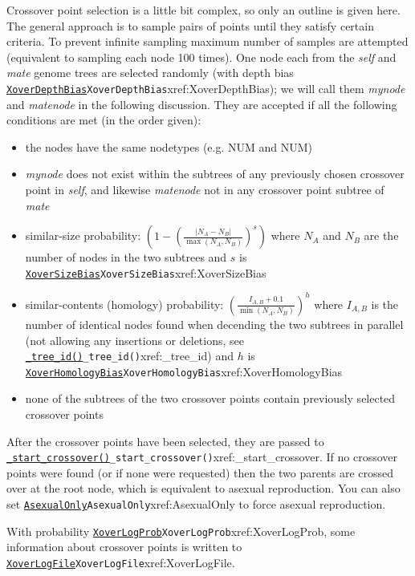 \documentclass[a4paper]{article}
\begin{document}
Crossover point selection is a little bit complex, so only an outline
is given here.  The general approach is to sample pairs of points
until they satisfy certain criteria.  To prevent infinite sampling
maximum number of samples are attempted (equivalent to sampling each
node 100 times).  One node each from the \textit{self} and
\textit{mate} genome trees are selected randomly (with depth bias
\hyperref[no]{\texttt{XoverDepthBias}}{\texttt{XoverDepthBias}}{xref:XoverDepthBias}); we will call them \textit{mynode} and
\textit{matenode} in the following discussion.  They are accepted if
all the following conditions are met (in the order given):
\begin{itemize}
\item the nodes have the same nodetypes (e.g. NUM and NUM)
\item \textit{mynode} does not exist within the subtrees of any previously chosen crossover point in \textit{self}, and likewise \textit{matenode} not in any crossover point subtree of \textit{mate}
\item similar-size probability:
 $ \left ( 1 - \left (\frac{|N_A - N_B|}{\max(N_A,N_B)} \right )^{s} \right ) $
where $N_A$ and $N_B$ are the number of nodes in the two subtrees and $s$ is \hyperref[no]{\texttt{XoverSizeBias}}{\texttt{XoverSizeBias}}{xref:XoverSizeBias}
\item similar-contents (homology) probability:
$ \left ( \frac{I_{A,B}+0.1}{\min(N_A,N_B)} \right )^{h} $
where $I_{A,B}$ is the number of identical nodes found when decending the two subtrees in parallel (not allowing any insertions or deletions, see \hyperref[no]{\texttt{\_tree\_id()}}{\texttt{\_tree\_id()}}{xref:_tree_id}) and $h$ is \hyperref[no]{\texttt{XoverHomologyBias}}{\texttt{XoverHomologyBias}}{xref:XoverHomologyBias}
\item none of the subtrees of the two crossover points contain previously selected crossover points
\end{itemize}

After the crossover points have been selected, they are passed to
\hyperref[no]{\texttt{\_start\_crossover()}}{\texttt{\_start\_crossover()}}{xref:_start_crossover}.  If no crossover points were found (or
if none were requested) then the two parents are crossed over at the
root node, which is equivalent to asexual reproduction.  You can also
set \hyperref[no]{\texttt{AsexualOnly}}{\texttt{AsexualOnly}}{xref:AsexualOnly} to force asexual reproduction.

With probability \hyperref[no]{\texttt{XoverLogProb}}{\texttt{XoverLogProb}}{xref:XoverLogProb}, some information about
crossover points is written to \hyperref[no]{\texttt{XoverLogFile}}{\texttt{XoverLogFile}}{xref:XoverLogFile}.
\end{document}
